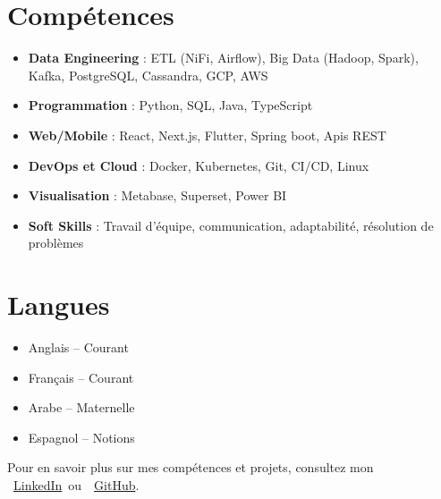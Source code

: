 \documentclass[10pt,a4paper,sans]{moderncv}
\begin{document}
  \section{\fontsize{11}{12.1}\selectfont Compétences}
  \vspace{-6pt}
  \begin{itemize}[leftmargin=0.3cm, itemsep=-2pt, topsep=0pt, partopsep=0pt, parsep=0pt]
    \item \textbf{Data Engineering} : ETL (NiFi, Airflow), Big Data (Hadoop, Spark), Kafka, PostgreSQL, Cassandra, GCP, AWS
    \item \textbf{Programmation} : Python, SQL, Java, TypeScript
    \item \textbf{Web/Mobile} : React, Next.js, Flutter, Spring boot, Apis REST
    \item \textbf{DevOps et Cloud} : Docker, Kubernetes, Git, CI/CD, Linux
    \item \textbf{Visualisation} : Metabase, Superset, Power BI
    \item \textbf{Soft Skills} : Travail d’équipe, communication, adaptabilité, résolution de problèmes
  \end{itemize}

  \vspace{-18pt}
  \section{\fontsize{11}{12.1}\selectfont Langues}
  \vspace{-19pt}
  \begin{multicols}{2}
  \begin{itemize}[leftmargin=0.3cm, itemsep=-2pt, topsep=0pt, partopsep=0pt, parsep=0pt]
      \item Anglais – Courant
      \item Français – Courant
      \item Arabe – Maternelle
      \item Espagnol – Notions
  \end{itemize}
  \end{multicols}


  \vspace{-22pt}
  \begin{center}
      {\fontsize{9}{11}\selectfont\color{gray}
      Pour en savoir plus sur mes compétences et projets, consultez mon~
      \faLinkedin~\href{https://www.linkedin.com/in/ahmed-makroum/}{LinkedIn}~ou~\faGithub~\href{https://github.com/ahmedmakroum}{GitHub}.}
  \end{center}

  
\end{document}
